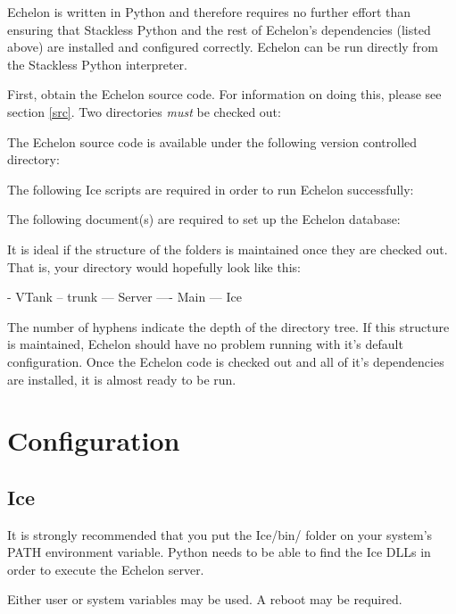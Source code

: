 Echelon is written in Python and therefore requires no further effort than ensuring that Stackless Python and the rest of Echelon's dependencies (listed above) are installed and configured correctly. Echelon can be run directly from the Stackless Python interpreter.

First, obtain the Echelon source code. For information on doing this, please see section \ref{src}. Two directories \emph{must} be checked out:

\label{echelon-structure}
The Echelon source code is available under the following version controlled directory:


The following Ice scripts are required in order to run Echelon successfully:


The following document(s) are required to set up the Echelon database:


It is ideal if the structure of the folders is maintained once they are checked out. That is, your directory would hopefully look like this:

\begin{command}
- VTank
-- trunk
--- Server
---- Main
--- Ice
\end{command}

The number of hyphens indicate the depth of the directory tree. If this structure is maintained, Echelon should have no problem running with it's default configuration. Once the Echelon code is checked out and all of it's dependencies are installed, it is almost ready to be run.

\section{Configuration}
\label{sec:echelon-config}

\subsection{Ice}

It is strongly recommended that you put the Ice/bin/ folder on your system's PATH environment variable. Python needs to be able to find the Ice DLLs in order to execute the Echelon server.

Either user or system variables may be used. A reboot may be required.

